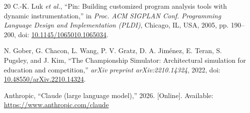 \documentclass[conference]{IEEEtran}
\begin{document}
\begin{thebibliography}{20}
C.-K. Luk \textit{et al.},
``Pin: Building customized program analysis tools with dynamic instrumentation,''
in \textit{Proc. ACM SIGPLAN Conf. Programming Language Design and Implementation (PLDI)},
Chicago, IL, USA, 2005, pp. 190--200,
doi: \href{https://doi.org/10.1145/1065010.1065034}{10.1145/1065010.1065034}.

N. Gober, G. Chacon, L. Wang, P. V. Gratz, D. A. Jiménez, E. Teran, S. Pugsley, and J. Kim,
``The Championship Simulator: Architectural simulation for education and competition,''
\textit{arXiv preprint arXiv:2210.14324}, 2022,
doi: \href{https://doi.org/10.48550/arXiv.2210.14324}{10.48550/arXiv.2210.14324}.

Anthropic, ``Claude (large language model),'' 2026. [Online]. Available: \url{https://www.anthropic.com/claude}

\end{thebibliography}
\end{document}
